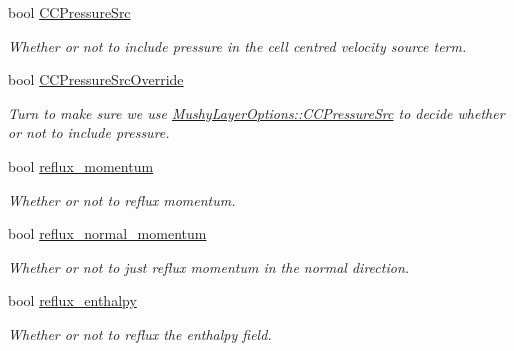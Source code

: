 \begin{DoxyCompactItemize}
bool \hyperlink{struct_mushy_layer_options_ab873fea567aee972e6604297009cd0be}{C\+C\+Pressure\+Src}
\begin{DoxyCompactList}\small\item\em Whether or not to include pressure in the cell centred velocity source term. \end{DoxyCompactList}\item 
bool \hyperlink{struct_mushy_layer_options_af54eaaeb12b789f2f5cc3b47867584ce}{C\+C\+Pressure\+Src\+Override}
\begin{DoxyCompactList}\small\item\em Turn to make sure we use \hyperlink{struct_mushy_layer_options_ab873fea567aee972e6604297009cd0be}{Mushy\+Layer\+Options\+::\+C\+C\+Pressure\+Src} to decide whether or not to include pressure. \end{DoxyCompactList}\item 
\mbox{\label{struct_mushy_layer_options_a465cfa3de637bc18a0f15075bc343439}} 
bool \hyperlink{struct_mushy_layer_options_a465cfa3de637bc18a0f15075bc343439}{reflux\+\_\+momentum}
\begin{DoxyCompactList}\small\item\em Whether or not to reflux momentum. \end{DoxyCompactList}\item 
\mbox{\label{struct_mushy_layer_options_a936a77f7fce8a7d0a93100478bef8631}} 
bool \hyperlink{struct_mushy_layer_options_a936a77f7fce8a7d0a93100478bef8631}{reflux\+\_\+normal\+\_\+momentum}
\begin{DoxyCompactList}\small\item\em Whether or not to just reflux momentum in the normal direction. \end{DoxyCompactList}\item 
\mbox{\label{struct_mushy_layer_options_ad52d6fdba865226b26190f88eb07f0fc}} 
bool \hyperlink{struct_mushy_layer_options_ad52d6fdba865226b26190f88eb07f0fc}{reflux\+\_\+enthalpy}
\begin{DoxyCompactList}\small\item\em Whether or not to reflux the enthalpy field. \end{DoxyCompactList}\item 
\mbox{\label{struct_mushy_layer_options_a57c02aa5dbb5863680cdeee3e6adfc9e}} 

\end{DoxyCompactItemize}
